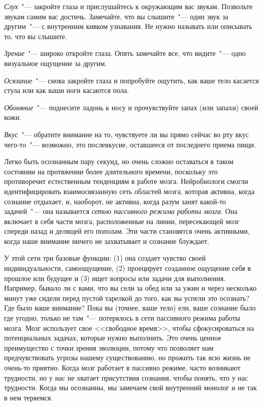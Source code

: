 \begin{itemize}
	\itemdiamondsuit \textit{Слух}~"--- закройте глаза и прислушайтесь к окружающим вас звукам. Позвольте звукам самим вас достичь. Замечайте, что вы слышите~"--- один звук за другим~"--- с внутренним кивком узнавания. Не нужно называть или описывать то, что вы слышите.
	
	\itemdiamondsuit \textit{Зрение}~"--- широко откройте глаза. Опять замечайте все, что видите~"--- одно визуальное ощущение за другим.
	
	\itemdiamondsuit \textit{Осязание}~"--- снова закройте глаза и попробуйте ощутить, как ваше тело касается стула или как ваши ноги касаются пола.
	
	\itemdiamondsuit \textit{Обоняние}~"--- поднесите ладонь к носу и прочувствуйте запах (или запахи) своей кожи. 
	
	\itemdiamondsuit \textit{Вкус}~"--- обратите внимание на то, чувствуете ли вы прямо сейчас во рту вкус чего-то~"--- возможно, это послевкусие, оставшееся от последнего приема пищи. 
\end{itemize}

Легко быть осознанным пару секунд, но очень сложно оставаться в таком состоянии на протяжении более длительного времени, поскольку это противоречит естественным тенденциям в работе мозга. Нейробиологи смогли идентифицировать взаимосвязанную сеть областей мозга, которая активна, когда сознание отдыхает, и, наоборот, не активна, когда разум занят какой-то задачей~"--- она называется \emph{сетью пассивного режима работы мозга}\cite{57}. Она включает в себя части мозга, расположенные на линии, пересекающей мозг спереди назад и делящей его пополам. Эти части становятся очень активными, когда наше внимание ничего не захватывает и сознание блуждает. 

У этой сети три базовые функции: (1) она создает чувство своей индивидуальности, самоощущение, (2) проецирует созданное ощущение себя в прошлое или будущее и (3) ищет вопросы или задачи для выполнения. Например, бывало ли с вами, что вы сели за обед или за ужин и через несколько минут уже сидели перед пустой тарелкой до того, как вы успели это осознать? Где было ваше внимание? Пока вы (точнее, ваше тело) ели, ваше сознание было где угодно, только не там~"--- потерялось в сети пассивного режима работы мозга. Мозг использует свое <<свободное время>>, чтобы сфокусироваться на потенциальных задачах, которые нужно выполнить. Это очень ценное преимущество с точки зрения эволюции, потому что позволяет нам предчувствовать угрозы нашему существованию, но прожить так всю жизнь не очень-то приятно. Когда мозг работает в пассивно режиме, часто возникают трудности, но у нас не хватает присутствия сознания, чтобы понять, что у нас трудности. Когда мы осознанны, мы замечаем свой внутренний монолог и не так в нем теряемся. 

